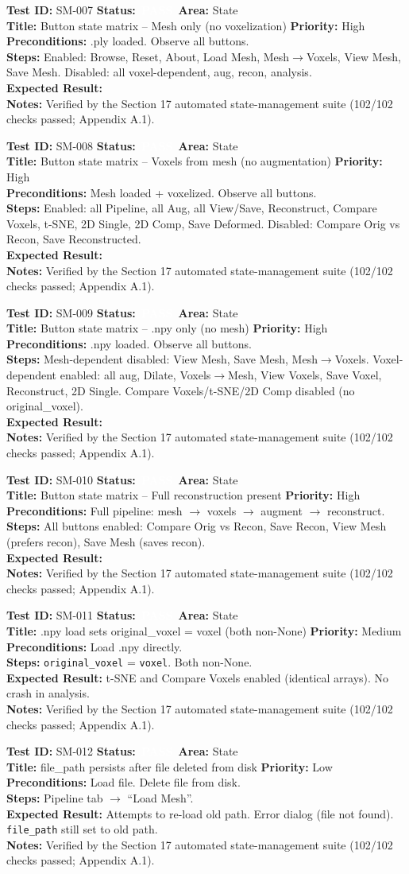 \documentclass[12pt,a4paper]{article}
\newcommand{\statuspass}{\colorbox{statusgreen}{\textcolor{white}{\textbf{\,PASS\,}}}}
\newcommand{\testcase}[9]{%
  \smallskip
  \noindent\textbf{Test ID:} #1 \hfill \textbf{Status:} #2 \hfill \textbf{Area:} #3 \\
  \textbf{Title:} #4 \hfill \textbf{Priority:} #5 \\[0.3em]
  \textbf{Preconditions:} #6 \\[0.3em]
  \textbf{Steps:} #7 \\[0.3em]
  \textbf{Expected Result:} #8 \\
  \textbf{Notes:} #9
  \smallskip
}
\begin{document}
\testcase{SM-007}{\statuspass}{State}{Button state matrix -- Mesh only (no voxelization)}{High}{.ply loaded. Observe all buttons.}{Enabled: Browse, Reset, About, Load Mesh, Mesh$\rightarrow$Voxels, View Mesh, Save Mesh. Disabled: all voxel-dependent, aug, recon, analysis.}{}{Verified by the Section 17 automated state-management suite (102/102 checks passed; Appendix A.1).}


\testcase{SM-008}{\statuspass}{State}{Button state matrix -- Voxels from mesh (no augmentation)}{High}{Mesh loaded + voxelized. Observe all buttons.}{Enabled: all Pipeline, all Aug, all View/Save, Reconstruct, Compare Voxels, t-SNE, 2D Single, 2D Comp, Save Deformed. Disabled: Compare Orig vs Recon, Save Reconstructed.}{}{Verified by the Section 17 automated state-management suite (102/102 checks passed; Appendix A.1).}


\testcase{SM-009}{\statuspass}{State}{Button state matrix -- .npy only (no mesh)}{High}{.npy loaded. Observe all buttons.}{Mesh-dependent disabled: View Mesh, Save Mesh, Mesh$\rightarrow$Voxels. Voxel-dependent enabled: all aug, Dilate, Voxels$\rightarrow$Mesh, View Voxels, Save Voxel, Reconstruct, 2D Single. Compare Voxels/t-SNE/2D Comp disabled (no original\_voxel).}{}{Verified by the Section 17 automated state-management suite (102/102 checks passed; Appendix A.1).}


\testcase{SM-010}{\statuspass}{State}{Button state matrix -- Full reconstruction present}{High}{Full pipeline: mesh $\rightarrow$ voxels $\rightarrow$ augment $\rightarrow$ reconstruct.}{All buttons enabled: Compare Orig vs Recon, Save Recon, View Mesh (prefers recon), Save Mesh (saves recon).}{}{Verified by the Section 17 automated state-management suite (102/102 checks passed; Appendix A.1).}


\testcase{SM-011}{\statuspass}{State}{.npy load sets original\_voxel = voxel (both non-None)}{Medium}{Load .npy directly.}{\texttt{original\_voxel} = \texttt{voxel}. Both non-None.}{t-SNE and Compare Voxels enabled (identical arrays). No crash in analysis.}{Verified by the Section 17 automated state-management suite (102/102 checks passed; Appendix A.1).}


\testcase{SM-012}{\statuspass}{State}{file\_path persists after file deleted from disk}{Low}{Load file. Delete file from disk.}{Pipeline tab $\rightarrow$ ``Load Mesh''.}{Attempts to re-load old path. Error dialog (file not found). \texttt{file\_path} still set to old path.}{Verified by the Section 17 automated state-management suite (102/102 checks passed; Appendix A.1).}
\end{document}

